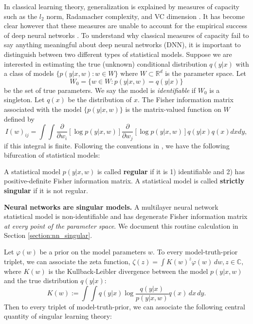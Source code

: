 \documentclass{article} %
\begin{document}
In classical learning theory, generalization is explained by measures of capacity such as the $l_2$ norm, Radamacher complexity, and VC dimension \citep{bousquet2003introduction}. It has become clear however that these measures are unable to account for the empirical success of deep neural networks \citep{zhang_understanding_2017}. 
To understand why classical measures of capacity fail to say anything meaningful about deep neural networks (DNN), it is important to distinguish between two different types of statistical models. Suppose we are interested in estimating the true (unknown) conditional distribution $q(y|x)$ with a class of models $\{p(y|x,w): w \in W\}$ where $W \subset \mathbb R^d$ is the parameter space. Let 
$$
W_0 = \{w \in W: p(y|x,w)=q(y|x)\}
$$
 be the set of true parameters. We say the model is \textit{identifiable} if $W_0$ is a singleton. Let $q(x)$ be the distribution of $x$. The Fisher information matrix associated with the model $\{p(y|x,w)\}$ is the matrix-valued function on $W$ defined by
 \begin{equation*}
 I(w)_{ij} = \int\!\int \frac{\partial}{\partial w_i}[ \log p(y|x,w) ] \frac{\partial}{\partial w_j}[ \log p(y|x,w) ] q(y|x) q(x) dx dy,
 \label{eq:FIM}
 \end{equation*}
if this integral is finite. 
Following the conventions in \cite{watanabe_algebraic_2009}, we have the following bifurcation of statistical models:
\begin{definition}
A statistical model $p(y|x,w)$ is called \textbf{regular} if it is 1) identifiable and 2) has positive-definite Fisher information matrix. A statistical model is called \textbf{strictly singular} if it is not regular. 
\end{definition}

\textbf{Neural networks are singular models.} A multilayer neural network statistical model is non-identifiable and has degenerate Fisher information matrix \emph{at every point of the parameter space}. We document this routine calculation in Section \ref{section:nn_singular}. 


Let  $\varphi(w)$ be a prior on the model parameters $w$.
To every model-truth-prior triplet, we can associate the zeta function,
$
\zeta(z) = \int K(w)^z \varphi(w) \,dw, z \in \mathbb C,
$
where $K(w)$ is the Kullback-Leibler divergence between the model $p(y|x,w)$ and the true distribution $q(y|x)$:
$$
    K(w) := \int \!\int q(y|x) \log \frac{ q(y|x) }{ p(y|x,w) } q(x) \,dx \,dy.
$$
Then to every triplet of model-truth-prior, we can associate the following central quantity of singular learning theory:
\end{document}
